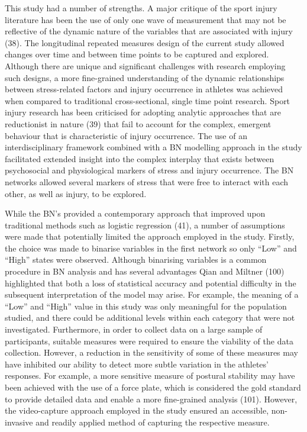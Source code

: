 \documentclass[
  english,
  man]{apa6}
\begin{document}
This study had a number of strengths.
A major critique of the sport injury literature has been the use of only one wave of measurement that may not be reflective of the dynamic nature of the variables that are associated with injury (38).
The longitudinal repeated measures design of the current study allowed changes over time and between time points to be captured and explored.
Although there are unique and significant challenges with research employing such designs, a more fine-grained understanding of the dynamic relationships between stress-related factors and injury occurrence in athletes was achieved when compared to traditional cross-sectional, single time point research.
Sport injury research has been criticised for adopting analytic approaches that are reductionist in nature (39) that fail to account for the complex, emergent behaviour that is characteristic of injury occurrence.
The use of an interdisciplinary framework combined with a BN modelling approach in the study facilitated extended insight into the complex interplay that exists between psychosocial and physiological markers of stress and injury occurrence.
The BN networks allowed several markers of stress that were free to interact with each other, as well as injury, to be explored.

While the BN's provided a contemporary approach that improved upon traditional methods such as logistic regression (41), a number of assumptions were made that potentially limited the approach employed in the study.
Firstly, the choice was made to binarise variables in the first network so only ``Low'' and ``High'' states were observed.
Although binarising variables is a common procedure in BN analysis and has several advantages Qian and Miltner (100) highlighted that both a loss of statistical accuracy and potential difficulty in the subsequent interpretation of the model may arise.
For example, the meaning of a ``Low'' and ``High'' value in this study was only meaningful for the population studied, and there could be additional levels within each category that were not investigated.
Furthermore, in order to collect data on a large sample of participants, suitable measures were required to ensure the viability of the data collection.
However, a reduction in the sensitivity of some of these measures may have inhibited our ability to detect more subtle variation in the athletes' responses.
For example, a more sensitive measure of postural stability may have been achieved with the use of a force plate, which is considered the gold standard to provide detailed data and enable a more fine-grained analysis (101).
However, the video-capture approach employed in the study ensured an accessible, non-invasive and readily applied method of capturing the respective measure.
\end{document}
